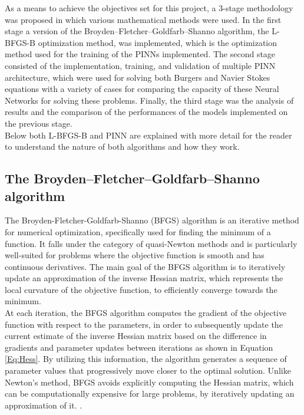 \documentclass[12pt,letterpaper]{article}
\begin{document}
As a means to achieve the objectives set for this project, a 3-stage methodology was proposed in which various mathematical methods were used. In the first stage a version of the Broyden–Fletcher–Goldfarb–Shanno algorithm, the L-BFGS-B optimization method, was implemented, which is the optimization method used for the training of the PINNs implemented. The second stage consisted of the implementation, training, and validation of multiple PINN architecture, which were used for solving both Burgers and Navier Stokes equations with a variety of cases for comparing the capacity of these Neural Networks for solving these problems. Finally, the third stage was the analysis of results and the comparison of the performances of the models implemented on the previous stage.\\

Below both L-BFGS-B and PINN are explained with more detail for the reader to understand the nature of both algorithms and how they work.


\subsection{The Broyden–Fletcher–Goldfarb–Shanno algorithm}

The Broyden-Fletcher-Goldfarb-Shanno (BFGS) algorithm is an iterative method for numerical optimization, specifically used for finding the minimum of a function. It falls under the category of quasi-Newton methods and is particularly well-suited for problems where the objective function is smooth and has continuous derivatives. The main goal of the BFGS algorithm is to iteratively update an approximation of the inverse Hessian matrix, which represents the local curvature of the objective function, to efficiently converge towards the minimum.\\

At each iteration, the BFGS algorithm computes the gradient of the objective function with respect to the parameters, in order to subsequently update the current estimate of the inverse Hessian matrix based on the difference in gradients and parameter updates between iterations as shown in Equation \ref{Eq:Hess}. By utilizing this information, the algorithm generates a sequence of parameter values that progressively move closer to the optimal solution. Unlike Newton's method, BFGS avoids explicitly computing the Hessian matrix, which can be computationally expensive for large problems, by iteratively updating an approximation of it. \cite{BFGS}.
\end{document}
